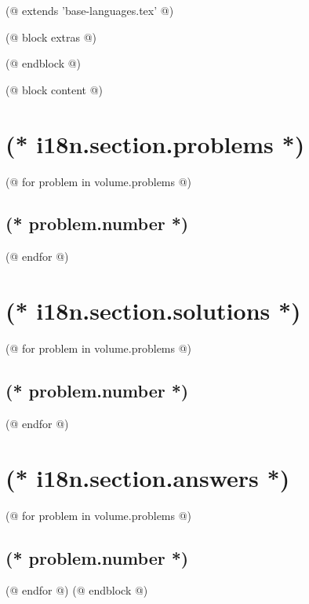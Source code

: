 (@ extends 'base-languages.tex' @)

(@ block extras @)
    
(@ endblock @)

(@ block content @)
    \thispagestyle{first}
    \vspace*{15mm}
    
    \newpage

    \pagestyle{main}
    \section{(* i18n.section.problems *)}
    \pagestyle{problems}    
    (@ for problem in volume.problems @)%
        \setcounter{volume}{(* volume.number *)}%
        \setcounter{problem}{(* problem.number *)}%
        \subsection{\texorpdfstring{(* problem.number *)}{(* problem.number *). (* problem.id *)}}%
    (@ endfor @)

    \newpage    
    \section{(* i18n.section.solutions *)}
    \pagestyle{solutions}    
    (@ for problem in volume.problems @)%
        \setcounter{volume}{(* volume.number *)}%
        \setcounter{problem}{(* problem.number *)}%
        \subsection{\texorpdfstring{(* problem.number *)}{(* problem.number *). (* problem.id *)}}%
    (@ endfor @)

    \newpage
    \section{(* i18n.section.answers *)}
    \pagestyle{answers}
    (@ for problem in volume.problems @)%
        \setcounter{volume}{(* volume.number *)}%
        \setcounter{problem}{(* problem.number *)}%
        \subsection{\texorpdfstring{(* problem.number *)}{(* problem.number *). (* problem.id *)}}%
    (@ endfor @)
(@ endblock @)
